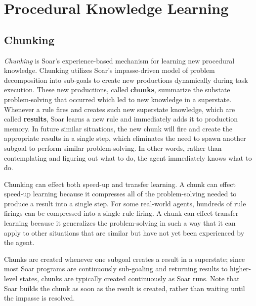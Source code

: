 \chapter{Procedural Knowledge Learning}
\label{CHUNKING}

\section{Chunking}

\textit{Chunking} is Soar's experience-based mechanism for learning new procedural knowledge.  Chunking utilizes Soar's impasse-driven model of problem decomposition into sub-goals to create new productions dynamically during task execution.  These new productions, called \textbf{chunks}, summarize the substate problem-solving that occurred which led to new knowledge in a superstate.  Whenever a rule fires and creates such new superstate knowledge, which are called \textbf{results}, Soar learns a new rule and immediately adds it to production memory.  In future similar situations, the new chunk will fire and create the appropriate results in a single step, which eliminates the need to spawn another subgoal to perform similar problem-solving.  In other words, rather than contemplating and figuring out what to do, the agent immediately knows what to do.

Chunking can effect both speed-up and transfer learning.  A chunk can effect speed-up learning because it compresses all of the problem-solving needed to produce a result into a single step.  For some real-world agents, hundreds of rule firings can be compressed into a single rule firing.  A chunk can effect transfer learning because it generalizes the problem-solving in such a way that it can apply to other situations that are similar but have not yet been experienced by the agent.

Chunks are created whenever one subgoal creates a result in a superstate; since most Soar programs are continuously sub-goaling and returning results to higher-level states, chunks are typically created continuously as Soar runs.  Note that Soar builds the chunk as soon as the result is created, rather than waiting until the impasse is resolved.

